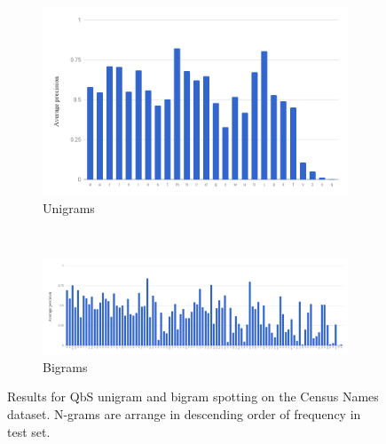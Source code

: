 \documentclass[ms,electronic,twosidetoc,letterpaper,chaptercenter,parttop,lof,lot]{byumsphd}
\begin{document}
\begin{figure}
\centering
\begin{subfigure}{.99\textwidth}
  \centering
  \includegraphics[width=.75\linewidth]{namesUniSpot}
  \caption{Unigrams}
  \label{fig:namesUniSpot}
\end{subfigure}
\\
\begin{subfigure}{.99\textwidth}
  \centering
  \includegraphics[width=.99\linewidth]{namesBiSpot}
  \caption{Bigrams}
  \label{fig:namesBiSpot}
\end{subfigure}
\caption{Results for QbS unigram and bigram spotting on the Census Names dataset. N-grams are arrange in descending order of frequency in test set.}
\label{fig:namessub}
\end{figure}
\end{document}
